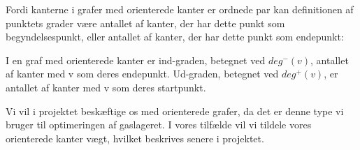 Fordi kanterne i grafer med orienterede kanter er ordnede par kan definitionen af punktets grader være antallet af kanter, der har dette punkt som begyndelsespunkt, eller antallet af kanter, der har dette punkt som endepunkt:
\begin{definition}
I en graf med orienterede kanter er ind-graden, betegnet ved $deg^{-}(v)$, antallet af kanter med v som deres endepunkt. Ud-graden, betegnet ved $deg^{+}(v)$, er antallet af kanter med v som deres startpunkt.
\end{definition}
Vi vil i projektet beskæftige os med orienterede grafer, da det er denne type vi bruger til optimeringen af gaslageret. I vores tilfælde vil vi tildele vores orienterede kanter vægt, hvilket beskrives senere i projektet.
